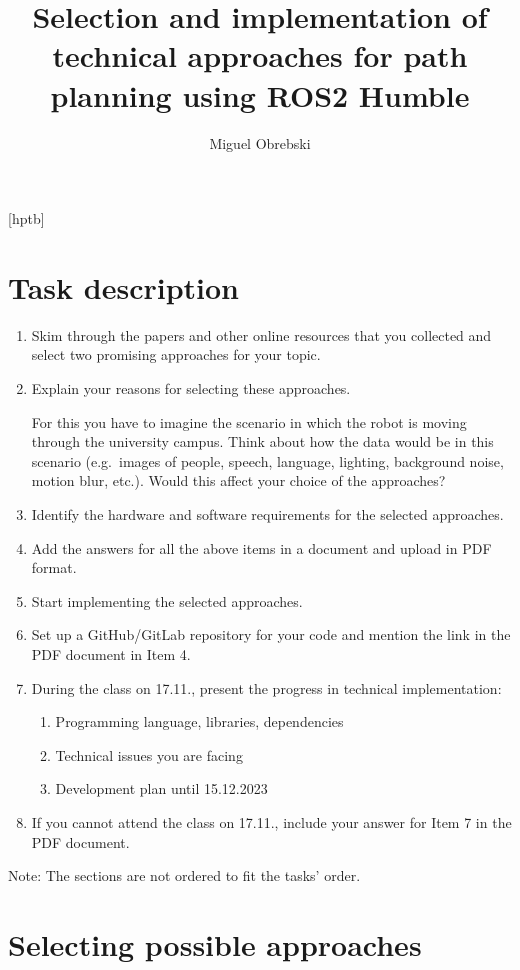 \documentclass[11pt,a4paper]{article}
\title{Selection and implementation of technical approaches for path planning using ROS2 Humble}
\author{Miguel Obrebski}
\date{} %
\begin{document}
[hptb]

\maketitle


\section{Task description}
\begin{enumerate}
	\item Skim through the papers and other online resources that you collected and select two promising approaches for your topic.
	\item Explain your reasons for selecting these approaches.

	      For this you have to imagine the scenario in which the robot is moving through the university campus. Think about how the data would be in this scenario (e.g.\
	      images of people, speech, language, lighting, background noise, motion blur, etc.). Would this affect your choice of the approaches?
	\item Identify the hardware and software requirements for the selected approaches.
	\item Add the answers for all the above items in a document and upload in PDF format.
	\item Start implementing the selected approaches.
	\item Set up a GitHub/GitLab repository for your code and mention the link in the PDF document in Item 4.
	\item During the class on 17.11., present the progress in technical implementation:

	      \begin{enumerate}
		      \item Programming language, libraries, dependencies
		      \item Technical issues you are facing
		      \item Development plan until 15.12.2023
	      \end{enumerate}
	\item If you cannot attend the class on 17.11., include your answer for Item 7 in the PDF document.
\end{enumerate}
Note: The sections are not ordered to fit the tasks' order.


\section{Selecting possible approaches}
\end{document}
